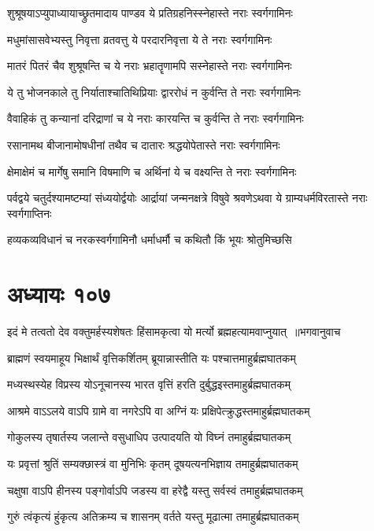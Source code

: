 \twolineshloka
{शुश्रूषयाऽप्युपाध्यायाच्छ्रुतमादाय पाण्डव}
{ये प्रतिग्रहनिस्स्नेहास्ते नराः स्वर्गगामिनः}


\twolineshloka
{मधुमांसासवेभ्यस्तु निवृत्ता व्रतवत्तु ये}
{परदारनिवृत्ता ये ते नराः स्वर्गगामिनः}


\twolineshloka
{मातरं पितरं चैव शुश्रूषन्ति च ये नराः}
{भ्रहातॄणामपि सस्नेहास्ते नराः स्वर्गगामिनः}


\twolineshloka
{ये तु भोजनकाले तु निर्याताश्चातिथिप्रियाः}
{द्वाररोधं न कुर्वन्ति ते नराः स्वर्गगामिनः}


\twolineshloka
{वैवाहिकं तु कन्यानां दरिद्राणां च ये नराः}
{कारयन्ति च कुर्वन्ति ते नराः स्वर्गगामिनः}


\twolineshloka
{रसानामथ बीजानामोषधीनां तथैव च}
{दातारः श्रद्धयोपेतास्ते नराः स्वर्गगामिनः}


\twolineshloka
{क्षेमाक्षेमं च मार्गेषु समानि विषमाणि च}
{अर्थिनां ये च वक्ष्यन्ति ते नराः स्वर्गगामिनः}


\threelineshloka
{पर्वद्वये चतुर्दश्यामष्टम्यां संध्ययोर्द्वयोः}
{आर्द्रायां जन्मनक्षत्रे विषुवे श्रवणेऽथवा}
{ये ग्राम्यधर्मविरतास्ते नराः स्वर्गगाप्तिनः}


\twolineshloka
{हव्यकव्यविधानं च नरकस्वर्गगामिनौ}
{धर्माधर्मौ च कथितौ किं भूयः श्रोतुमिच्छसि}


\chapter{अध्यायः १०७}
\threelineshloka
{इदं मे तत्वतो देव वक्तुमर्हस्यशेषतः}
{हिंसामकृत्वा यो मर्त्यो ब्रह्महत्यामवाप्नुयात् ॥भगवानुवाच}
{}


\twolineshloka
{ब्राह्मणं स्वयमाहूय भिक्षार्थं वृत्तिकर्शितम्}
{ब्रूयान्नास्तीति यः पश्चात्तमाहुर्ब्रह्मघातकम्}


\twolineshloka
{मध्यस्थस्येह विप्रस्य योऽनूचानस्य भारत}
{वृत्तिं हरति दुर्बुद्धइस्तमाहुर्ब्रह्मघातकम्}


\twolineshloka
{आश्रमे वाऽऽलये वाऽपि ग्रामे वा नगरेऽपि वा}
{अग्निं यः प्रक्षिपेत्क्रुद्धस्तमाहुर्ब्रह्मघातकम्}


\twolineshloka
{गोकुलस्य तृषार्तस्य जलान्ते वसुधाधिप}
{उत्पादयति यो विघ्नं तमाहुर्ब्रह्मघातकम्}


\twolineshloka
{यः प्रवृत्तां श्रुतिं सम्यक्छास्त्रं वा मुनिभिः कृतम्}
{दूषयत्यनभिज्ञाय तमाहुर्ब्रह्मघातकम्}


\twolineshloka
{चक्षुषा वाऽपि हीनस्य पङ्गोर्वाऽपि जडस्य वा}
{हरेद्वै यस्तु सर्वस्वं तमाहुर्ब्रह्मघातकम्}


\twolineshloka
{गुरुं त्वंकृत्यं हुंकृत्य अतिक्रम्य च शासनम्}
{वर्तते यस्तु मूढात्मा तमाहुर्ब्रह्मघातकम्}


